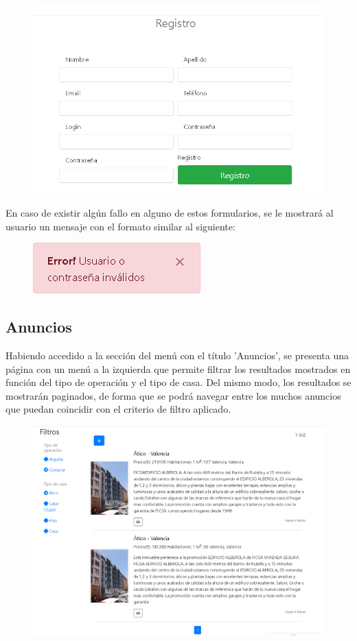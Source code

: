 \begin{figure}[h!]
\centering
\includegraphics[width=.5\textwidth]{Img/ManualUsuario/REGISTRO.png}
\end{figure}

En caso de existir alg\'{u}n fallo en alguno de estos formularios, se le mostrar\'{a} al usuario un mensaje con el formato similar al siguiente:

\begin{figure}[h!]
\centering
\includegraphics[width=.3\textwidth]{Img/ManualUsuario/ERROR_LOGIN.png}
\end{figure}


\subsection{Anuncios}
Habiendo accedido a la secci\'{o}n del men\'{u} con el t\'{i}tulo 'Anuncios', se presenta una p\'{a}gina con un men\'{u} a la izquierda que permite filtrar los resultados mostrados en funci\'{o}n del tipo de operaci\'{o}n y el tipo de casa. Del mismo modo, los resultados se mostrar\'{a}n paginados, de forma que se podr\'{a} navegar entre los muchos anuncios que puedan coincidir con el criterio de filtro aplicado.

\begin{figure}[h!]
\centering
\includegraphics[width=.7\textwidth]{Img/ManualUsuario/LISTADO_ANUNCIOS.png}
\end{figure}


